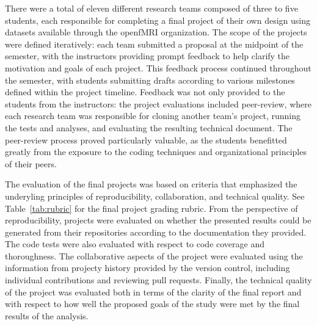 There were a total of eleven different research teams composed of three
to five students, each responsible for completing a final project of their
own design using datasets available through the openfMRI organization.
The scope of the projects were defined iteratively: each team submitted a 
proposal at the midpoint of the semester, with the instructors providing
prompt feedback to help clarify the motivation and goals of each project.
This feedback process continued throughout the semester, with students 
submitting drafts according to various milestones defined within the project
timeline.
Feedback was not only provided to the students from the instructors: the
project evaluations included peer-review, where each research team was
responsible for cloning another team's project, running the tests and analyses,
and evaluating the resulting technical document.
The peer-review process proved particularly valuable, as the students 
benefitted greatly from the exposure to the coding techniques and 
organizational principles of their peers.

The evaluation of the final projects was based on criteria that emphasized the
underyling principles of reproducibility, collaboration, and technical
quality.
See Table~\ref{tab:rubric} for the final project grading rubric.
From the perspective of reproducibility, projects were evaluated on whether the
presented results could be generated from their repositories according to the
documentation they provided.
The code tests were also evaluated with respect to code coverage
and thoroughness.
The collaborative aspects of the project were evaluated using the information
from projecty history provided by the version control, including
individual contributions and reviewing pull requests.
Finally, the technical quality of the project was evaluated both in terms of
the clarity of the final report and with respect to how well the proposed
goals of the study were met by the final results of the analysis.

